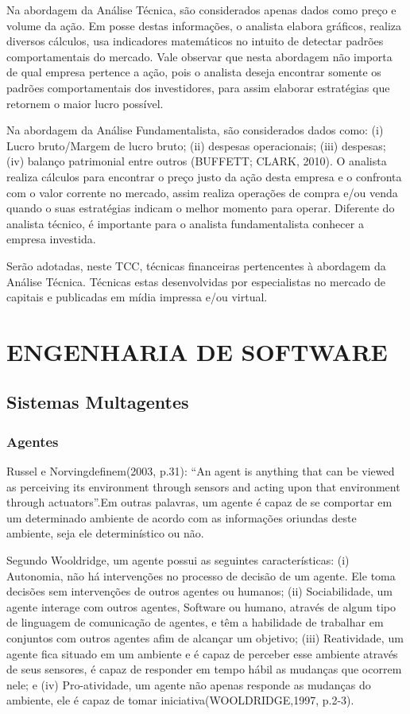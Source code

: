 Na abordagem da Análise Técnica, são considerados apenas dados como preço e volume da ação. Em posse destas informações, o analista elabora gráficos, realiza diversos cálculos, usa indicadores matemáticos no intuito de detectar padrões comportamentais do mercado. Vale observar que nesta abordagem não importa de qual empresa pertence a ação, pois o analista deseja encontrar somente os padrões comportamentais dos investidores, para assim elaborar estratégias que retornem o maior lucro possível.

Na abordagem da Análise Fundamentalista, são considerados dados como: (i) Lucro bruto/Margem de lucro bruto; (ii) despesas operacionais; (iii) despesas; (iv) balanço patrimonial  entre outros (BUFFETT; CLARK, 2010). O analista realiza cálculos para encontrar o preço justo da ação desta empresa e o confronta com o valor corrente no mercado, assim realiza operações de compra e/ou venda quando o suas estratégias indicam o melhor momento para operar. Diferente do analista técnico, é importante para o analista fundamentalista conhecer a empresa investida.

Serão adotadas, neste TCC, técnicas financeiras pertencentes à abordagem da Análise Técnica. Técnicas estas desenvolvidas por especialistas no mercado de capitais e publicadas em mídia impressa e/ou virtual.

\section{ENGENHARIA DE SOFTWARE}
\subsection{Sistemas Multagentes}
\subsubsection{Agentes}
Russel e Norvingdefinem(2003, p.31): “An agent is anything that can be viewed as perceiving its environment through sensors and acting upon that environment through actuators”.Em outras palavras, um agente é capaz de se comportar em um determinado ambiente de acordo com as informações oriundas deste ambiente, seja ele determinístico ou não.

Segundo Wooldridge, um agente possui as seguintes características: (i) Autonomia, não há intervenções no processo de decisão de um agente. Ele toma decisões sem intervenções de outros agentes ou humanos; (ii) Sociabilidade, um agente interage com outros agentes, Software ou humano, através de algum tipo de linguagem de comunicação de agentes, e têm a habilidade de trabalhar em conjuntos com outros agentes afim de alcançar um objetivo; (iii) Reatividade, um agente fica situado em um ambiente e é capaz de perceber esse ambiente através de seus sensores, é capaz de responder em tempo hábil as mudanças que ocorrem nele; e (iv) Pro-atividade, um agente não apenas responde as mudanças do ambiente, ele é capaz de tomar iniciativa(WOOLDRIDGE,1997, p.2-3).

